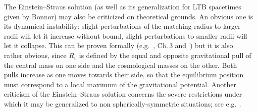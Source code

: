 \documentclass
[rmp,aps,twocolumn,showpacs,preprintnumbers,amsmath,amssymb]{revtex4}
\theoremstyle{plain}
\theoremstyle{definition}
\theoremstyle{remark}
\begin{document}
The Einstein--Straus solution (as well as its generalization for LTB 
spacetimes given by Bonnor) may also be criticized on theoretical grounds. 
An obvious one is its dynamical instability: slight perturbations of the 
matching radius to larger radii will let it increase without bound, slight 
perturbations to smaller radii will let it collapse. This can be proven 
formally (e.g.~\cite{Krasinski:1998}, Ch.\,3 and~\cite{Bonnor:2000b}) but 
it is also rather obvious, since $R_v$ is defined by the equal and opposite 
gravitational pull of the central mass on one side and the cosmological 
masses on the other. Both pulls increase as one moves towards their side, 
so that the equilibrium position must correspond to a local maximum of 
the gravitational potential. Another criticism of the Einstein--Straus 
solution concerns the severe restrictions under which it may be 
generalized to non spherically-symmetric situations; see 
e.g.~\cite{Senovilla.Vera:1997,Mena.etal:2002,Mena.etal:2003,Mena.etal:2005}.
\end{document}
